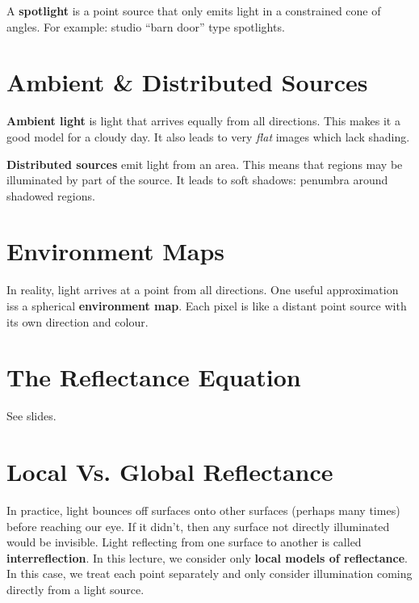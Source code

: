 \documentclass{article}
\begin{document}
A {\bf spotlight} is a point source that only emits light in a constrained cone of angles.
For example: studio ``barn door'' type spotlights.

\section{Ambient \& Distributed Sources}
{\bf Ambient light} is light that arrives equally from all directions.
This makes it a good model for a cloudy day.
It also leads to very {\it flat} images which lack shading.

{\bf Distributed sources} emit light from an area.
This means that regions may be illuminated by part of the source.
It leads to soft shadows: penumbra around shadowed regions.

\section{Environment Maps}
In reality, light arrives at a point from all directions.
One useful approximation iss a spherical {\bf environment map}.
Each pixel is like a distant point source with its own direction and colour.

\section {The Reflectance Equation}
See slides.

\section{Local Vs. Global Reflectance}
In practice, light bounces off surfaces onto other surfaces (perhaps many times) before reaching our eye.
If it didn't, then any surface  not directly illuminated would be invisible.
Light reflecting from one surface to another is called {\bf interreflection}.
In this lecture, we consider only {\bf local models of reflectance}.
In this case, we treat each point separately and only consider illumination coming directly from a light source.
\end{document}
